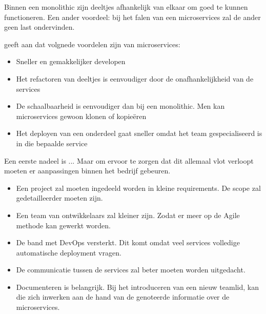 Binnen een monolithic zijn deeltjes afhankelijk van elkaar om goed te kunnen functioneren. Een ander voordeel: bij het falen van een microservices zal de ander geen last ondervinden. 

\textcite{Benetis2016} geeft aan dat volgnede voordelen zijn van microservices:
\begin{itemize}
	\item Sneller en gemakkelijker developen
	\item Het refactoren van deeltjes is eenvoudiger door de onafhankelijkheid van de services
	\item De schaalbaarheid is eenvoudiger dan bij een monolithic. Men kan microservices gewoon klonen of kopieëren
	\item Het deployen van een onderdeel gaat sneller omdat het team gespecialiseerd is in die bepaalde service
\end{itemize}

Een eerste nadeel is ...
Maar om ervoor te zorgen dat dit allemaal vlot verloopt moeten er aanpassingen binnen het bedrijf gebeuren. 
\begin{itemize}
	\item Een project zal moeten ingedeeld worden in kleine requirements. De scope zal gedetailleerder moeten zijn.
	\item Een team van ontwikkelaars zal kleiner zijn. Zodat er meer op de Agile methode kan gewerkt worden.
	\item De band met DevOps versterkt. Dit komt omdat veel services volledige automatische deployment vragen.
	\item De communicatie tussen de services zal beter moeten worden uitgedacht.
	\item Documenteren is belangrijk. Bij het introduceren van een nieuw teamlid, kan die zich inwerken aan de hand van de genoteerde informatie over de microservices.
\end{itemize}

